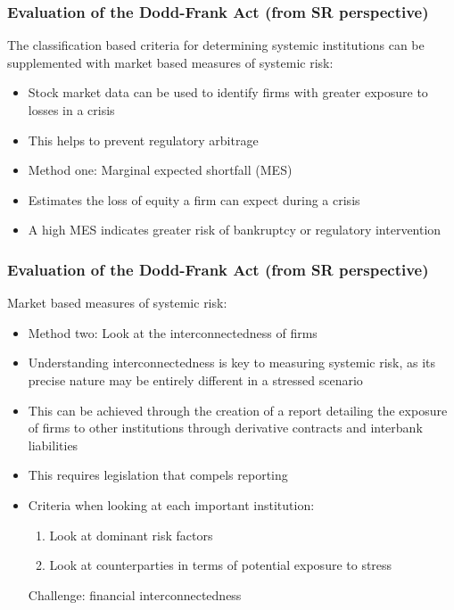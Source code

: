 \documentclass[11pt]{beamer}
\begin{document}

\begin{frame}
\frametitle{Evaluation of the Dodd-Frank Act (from SR perspective)}
The classification based criteria for determining systemic institutions can be supplemented with market based measures of systemic risk:
\begin{itemize}\itemsep10pt
  \item Stock market data can be used to identify firms with greater exposure to losses in a crisis
  \item This helps to prevent regulatory arbitrage
  \item Method one: Marginal expected shortfall (MES)
  \item Estimates the loss of equity a firm can expect during a crisis
  \item A high MES indicates greater risk of bankruptcy or regulatory intervention
\end{itemize}
\end{frame}


\begin{frame}
\frametitle{Evaluation of the Dodd-Frank Act (from SR perspective)}
Market based measures of systemic risk:
\begin{itemize}\itemsep10pt
	\item Method two: Look at the interconnectedness of firms
    \item Understanding interconnectedness is key to measuring systemic risk, as its precise nature may be entirely different in a stressed scenario
 	\item This can be achieved through the creation of a report detailing the exposure of firms to other institutions through derivative contracts and interbank liabilities
  	\item This requires legislation that compels reporting
  	\item Criteria when looking at each important institution:
	\begin{enumerate}\itemsep5pt
		\item Look at dominant risk factors
		\item Look at counterparties in terms of potential exposure to stress
	\end{enumerate}
    Challenge: financial interconnectedness
\end{itemize}
\end{frame}
\end{document}
